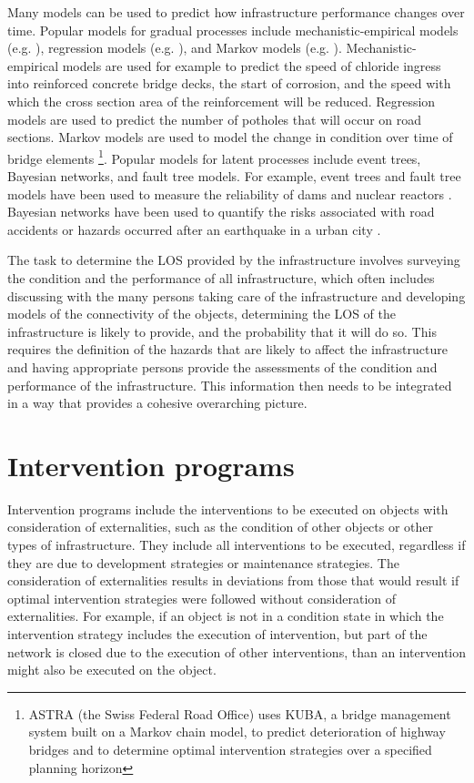 Many models can be used to predict how infrastructure performance changes over time. Popular models for gradual processes include mechanistic-empirical models (e.g. \cite{Newbery1988}), regression models (e.g. \cite{Madanat1995}), and Markov models (e.g. \cite{Lethanh2015}). Mechanistic-empirical models are used for example to predict the speed of chloride ingress into reinforced concrete bridge decks, the start of corrosion, and the speed with which the cross section area of the reinforcement will be reduced. Regression models are used to predict the number of potholes that will occur on road sections. Markov models are used to model the change in condition over time of bridge elements \citep{ASTRA2010}\footnote{ASTRA (the Swiss Federal Road  Office) uses KUBA, a bridge management system built on a Markov chain model, to predict deterioration of highway bridges and to determine optimal intervention strategies over a specified planning horizon}. Popular models for latent processes include event trees, Bayesian networks, and fault tree models. For example, event trees and fault tree models have been used to measure the reliability of dams and nuclear reactors \citep{Pate-Cornell1984}. Bayesian networks have been used to quantify the risks associated with road accidents \citep{Deublein2013,Kohler2007} or hazards occurred after an earthquake in a urban city \citep{Bayraktarli2011}.

The task to determine the LOS provided by the infrastructure involves surveying the condition and the performance of all infrastructure, which often includes discussing with the many persons taking care of the infrastructure and developing models of the connectivity of the objects, determining the LOS of the infrastructure is likely to provide, and the probability that it will do so. This requires the definition of the hazards that are likely to affect the infrastructure and having appropriate persons provide the assessments of the condition and performance of the infrastructure. This information then needs to be integrated in a way that provides a cohesive overarching picture.

\section{Intervention programs}
Intervention programs include the interventions to be executed on objects with consideration of externalities, such as the condition of other objects or other types of infrastructure. They include all interventions to be executed, regardless if they are due to development strategies or maintenance strategies. The consideration of externalities results in deviations from those that would result if optimal intervention strategies were followed without consideration of externalities. For example, if an object is not in a condition state in which the intervention strategy includes the execution of intervention, but part of the network is closed due to the execution of other interventions, than an intervention might also be executed on the object. 


